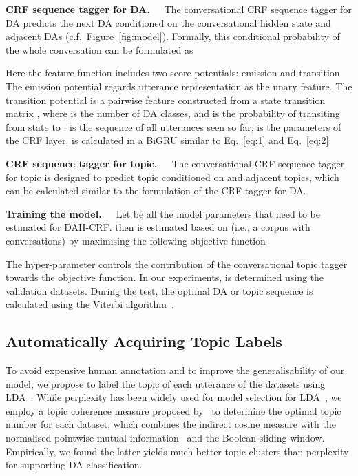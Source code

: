 \documentclass[11pt,a4paper]{article}
\begin{document}
\noindent\textbf{CRF sequence tagger for DA.}~~~The conversational CRF sequence tagger for DA predicts the next DA  conditioned on the conversational hidden state  and adjacent DAs (c.f.~Figure~\ref{fig:model}). Formally, this conditional probability of the whole conversation can be formulated as



Here the feature function  includes two score potentials: emission and transition. The emission potential  regards utterance representation  as the unary feature. The transition potential  is a pairwise feature constructed from a  state transition matrix , where  is the number of DA classes, and   is the probability of transiting from state  to .   is the sequence of all utterances seen so far,  is the parameters of the CRF layer.  is calculated in a BiGRU similar to Eq.~\ref{eq:1} and Eq.~\ref{eq:2}:



\noindent\textbf{CRF sequence tagger for topic.}~~~The conversational CRF sequence tagger for topic is designed to predict topic  conditioned on  and adjacent topics, which can be calculated similar to the formulation of the CRF tagger for DA.



\noindent\textbf{Training the model.}~~~Let  be all the model parameters that need to be estimated for DAH-CRF.   then is estimated based on  (i.e., a corpus with  conversations) by maximising the following objective function

The hyper-parameter  controls the contribution of the conversational topic tagger towards the objective function. In our experiments,  is determined using the validation datasets. During the test, the optimal DA or topic sequence is calculated using the Viterbi algorithm~\cite{viterbi1967error}.



\subsection{Automatically Acquiring Topic Labels}

To avoid expensive human annotation and to improve the generalisability of our model, we propose to label the topic of each utterance of the datasets using LDA~\cite{blei2003latent}. 
While perplexity has been widely used for model selection for LDA~\cite{chenghua2011probabilistic,he2012online}, we employ a topic coherence measure proposed by~\cite{roder2015exploring} to determine the optimal topic number for each dataset, which combines the indirect cosine measure with the normalised pointwise mutual information~\cite[NPMI]{bouma2009normalized} and the Boolean sliding window. Empirically, we found the latter yields much better topic clusters than perplexity for supporting DA classification. 
\end{document}
